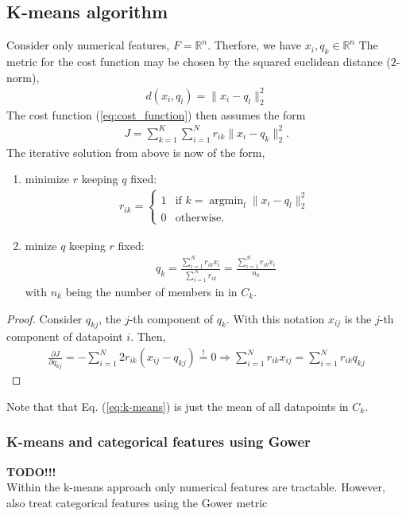 \documentclass[10pt,a4paper]{article}
\begin{document}
\subsection{K-means algorithm}
Consider only numerical features, $F = \mathbb R^n$. Therfore, we have $x_i, q_k \in \mathbb R^n$ The metric for the cost function may be chosen by the squared euclidean distance ($2$-norm),
\begin{align}
d(x_i, q_l) = \rVert x_i -  q_l\rVert_2^2
\end{align} 
The cost function (\ref{eq:cost_function}) then assumes the form
\begin{align} 
J = \sum _{k=1}^K \sum_{i=1} ^ N  r_{ik} \rVert x_i -  q_k\rVert_2^2.
\end{align} 
The iterative solution from above is now of the form,
\begin{enumerate}
\item minimize $r$ keeping $q$ fixed:
\begin{align}
r_{ik} = \begin{cases}
1 & \text{if } k = \operatorname{argmin}_l \rVert x_i -  q_l\rVert_2^2  \\
0 & \text{otherwise}.
\end{cases}
\end{align}
\item minize $q$ keeping $r$ fixed:
\begin{align} \label{eq:k-means}
q_k = \frac{\sum_{i=1}^N r_{ik}x_i}{\sum_{i=1}^N r_{ik}} = \frac{\sum_{i=1}^N r_{ik}x_i}{n_k}
\end{align}
with $n_k$ being the number of members in in $C_k$.
\end{enumerate}
\begin{proof}
Consider  $q_{kj}$,  the $j$-th component of $q_k$. With this notation $x_{ij}$ is the $j$-th component of datapoint $i$.  Then,
\begin{align*} 
\frac{\partial J} {\partial q_{kj}} = -\sum_{i=1} ^N  2 r_{ik}  (x_{ij} - q_{kj})
\overset{!}{=} 0 \Rightarrow  \sum_{i=1} ^N   r_{ik}  x_{ij}  = \sum_{i=1} ^N   r_{ik} q_{kj}
\end{align*}
\end{proof}
Note that that Eq. (\ref{eq:k-means}) is just the mean of all datapoints in $C_k$. 
\subsubsection{K-means  and categorical features using Gower }
\textbf{TODO!!!}\\
Within the k-means approach only numerical features are tractable.
However, also treat categorical features using the Gower metric 

\end{document}
